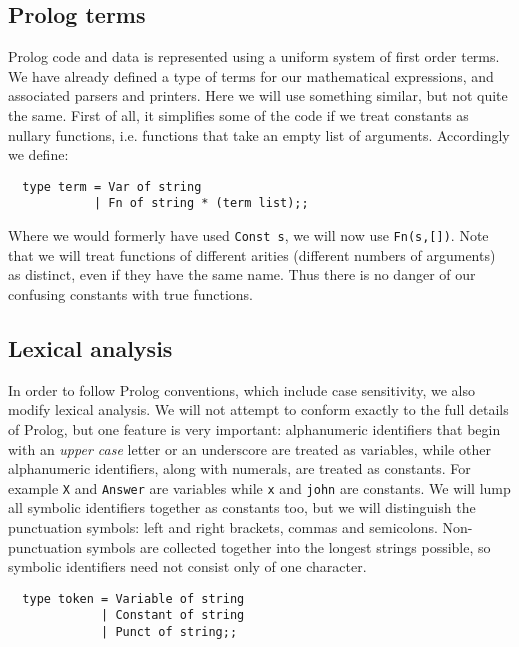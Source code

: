 \subsection{Prolog terms}

Prolog code and data is represented using a uniform system of first order
terms. We have already defined a type of terms for our mathematical
expressions, and associated parsers and printers. Here we will use something
similar, but not quite the same. First of all, it simplifies some of the code
if we treat constants as nullary functions, i.e. functions that take an empty
list of arguments. Accordingly we define:

\begin{boxed}\begin{verbatim}
  type term = Var of string
            | Fn of string * (term list);;
\end{verbatim}\end{boxed}

Where we would formerly have used {\verb+Const s+}, we will now use
{\verb+Fn(s,[])+}. Note that we will treat functions of different arities
(different numbers of arguments) as distinct, even if they have the same name.
Thus there is no danger of our confusing constants with true functions.

\subsection{Lexical analysis}

In order to follow Prolog conventions, which include case sensitivity, we also
modify lexical analysis. We will not attempt to conform exactly to the full
details of Prolog, but one feature is very important: alphanumeric identifiers
that begin with an {\em upper case} letter or an underscore are treated as
variables, while other alphanumeric identifiers, along with numerals, are
treated as constants. For example {\verb+X+} and {\verb+Answer+} are variables
while {\verb+x+} and {\verb+john+} are constants. We will lump all symbolic
identifiers together as constants too, but we will distinguish the punctuation
symbols: left and right brackets, commas and semicolons. Non-punctuation
symbols are collected together into the longest strings possible, so symbolic
identifiers need not consist only of one character.

\begin{boxed}\begin{verbatim}
  type token = Variable of string
             | Constant of string
             | Punct of string;;
\end{verbatim}\end{boxed}

